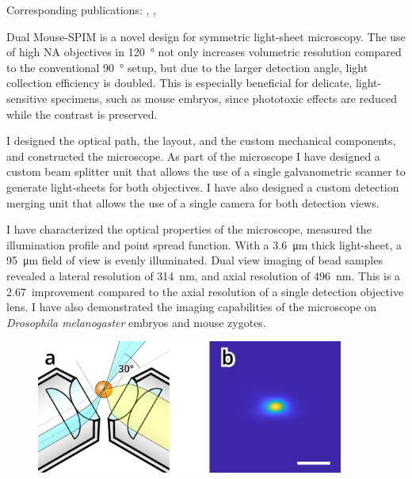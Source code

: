 \documentclass{booklet_style}
\begin{document}
Corresponding publications: \cite{de_medeiros_light-sheet_2016}, \cite{strnad_inverted_2016}, \cite{hoyer_breaking_2016}

Dual Mouse-SPIM is a novel design for symmetric light-sheet microscopy. The use of high NA objectives in \SI{120}{\degree} not only increases volumetric resolution compared to the conventional \SI{90}{\degree} setup, but due to the larger detection angle, light collection efficiency is doubled. This is especially beneficial for delicate, light-sensitive specimens, such as mouse embryos, since phototoxic effects are reduced while the contrast is preserved.

I designed the optical path, the layout, and the custom mechanical components, and constructed the microscope. As part of the microscope I have designed a custom beam splitter unit that allows the use of a single galvanometric scanner to generate light-sheets for both objectives. I have also designed a custom detection merging unit that allows the use of a single camera for both detection views.

I have characterized the optical properties of the microscope, measured the illumination profile and point spread function. With a \SI{3.6}{\micro m} thick light-sheet, a \SI{95}{\micro m} field of view is evenly illuminated. Dual view imaging of bead samples revealed a lateral resolution of \SI{314}{nm}, and axial resolution of \SI{496}{nm}. This is a 2.67\texttimes\ improvement compared to the axial resolution of a single detection objective lens. I have also demonstrated the imaging capabilities of the microscope on \textit{Drosophila melanogaster} embryos and mouse zygotes.

\begin{figure}
  \centering
  \includegraphics[width=0.9\textwidth]{2_DualMouse/120+psf}
  \label{fig:DualMouse}
\end{figure}
\end{document}
